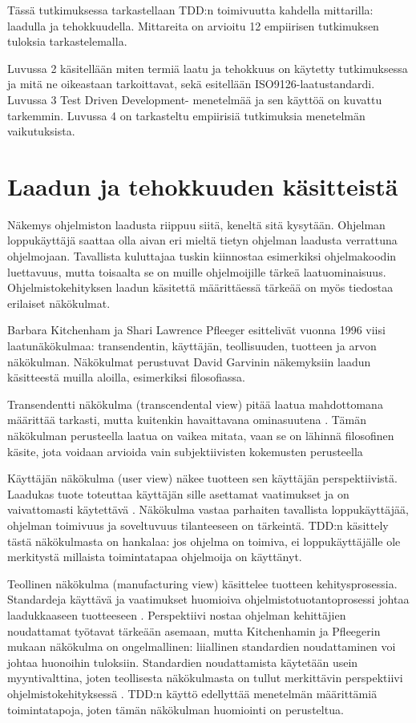 \documentclass[finnish]{tktltiki2}
\theoremstyle{definition}
\theoremstyle{remark}
\begin{document}
Tässä tutkimuksessa tarkastellaan TDD:n toimivuutta kahdella mittarilla: laadulla ja tehokkuudella. Mittareita on arvioitu 12 empiirisen tutkimuksen tuloksia tarkastelemalla.

Luvussa 2 käsitellään miten termiä laatu ja tehokkuus on käytetty tutkimuksessa ja mitä ne oikeastaan tarkoittavat, sekä esitellään ISO9126-laatustandardi. Luvussa 3 Test Driven Development- menetelmää ja sen käyttöä on kuvattu tarkemmin. Luvussa 4 on tarkasteltu empiirisiä tutkimuksia menetelmän vaikutuksista.


\section{Laadun ja tehokkuuden käsitteistä}

Näkemys ohjelmiston laadusta riippuu siitä, keneltä sitä kysytään. Ohjelman loppukäyttäjä saattaa olla aivan eri mieltä tietyn ohjelman laadusta verrattuna ohjelmojaan. Tavallista kuluttajaa tuskin kiinnostaa esimerkiksi ohjelmakoodin luettavuus, mutta toisaalta se on muille ohjelmoijille tärkeä laatuominaisuus. Ohjelmistokehityksen laadun käsitettä määrittäessä tärkeää on myös tiedostaa erilaiset näkökulmat.

Barbara Kitchenham ja Shari Lawrence Pfleeger \cite{Kitchenham96} esittelivät vuonna 1996 viisi laatunäkökulmaa: transendentin, käyttäjän, teollisuuden, tuotteen ja arvon näkökulman. Näkökulmat perustuvat David Garvinin näkemyksiin laadun käsitteestä muilla aloilla, esimerkiksi filosofiassa.

Transendentti näkökulma (transcendental view) pitää laatua mahdottomana määrittää tarkasti, mutta kuitenkin havaittavana ominasuutena \cite{Kitchenham96}. Tämän näkökulman perusteella laatua on vaikea mitata, vaan se on lähinnä filosofinen käsite, jota voidaan arvioida vain subjektiivisten kokemusten perusteella

Käyttäjän näkökulma (user view) näkee tuotteen sen käyttäjän perspektiivistä. Laadukas tuote toteuttaa käyttäjän sille asettamat vaatimukset ja on vaivattomasti käytettävä \cite{Kitchenham96}. Näkökulma vastaa parhaiten tavallista loppukäyttäjää, ohjelman toimivuus ja soveltuvuus tilanteeseen on tärkeintä. TDD:n käsittely tästä näkökulmasta on hankalaa: jos ohjelma on toimiva, ei loppukäyttäjälle ole merkitystä millaista toimintatapaa ohjelmoija on käyttänyt.

Teollinen näkökulma (manufacturing view) käsittelee tuotteen kehitysprosessia. Standardeja käyttävä ja vaatimukset huomioiva ohjelmistotuotantoprosessi johtaa laadukkaaseen tuotteeseen \cite{Kitchenham96}. Perspektiivi nostaa ohjelman kehittäjien noudattamat työtavat tärkeään asemaan, mutta Kitchenhamin ja Pfleegerin mukaan näkökulma on ongelmallinen: liiallinen standardien noudattaminen voi johtaa huonoihin tuloksiin. Standardien noudattamista käytetään usein myyntivalttina, joten teollisesta näkökulmasta on tullut merkittävin perspektiivi ohjelmistokehityksessä \cite{Cote07}. TDD:n käyttö edellyttää menetelmän määrittämiä toimintatapoja, joten tämän näkökulman huomiointi on perusteltua. 
\end{document}
